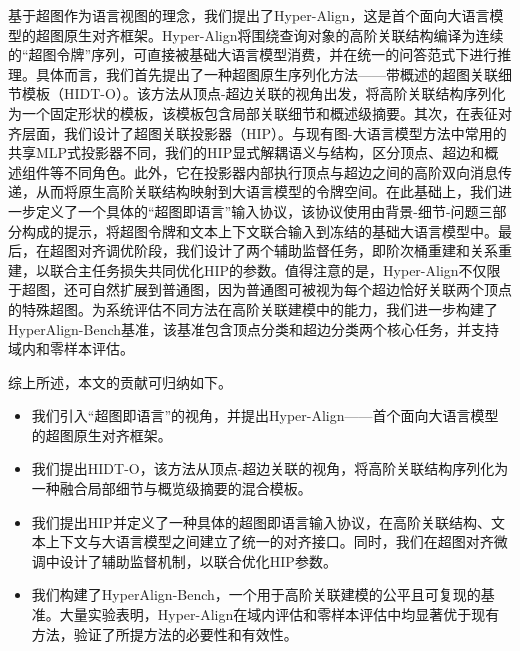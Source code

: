 \documentclass[10pt]{article}
\begin{document}
基于超图作为语言视图的理念，我们提出了Hyper-Align，这是首个面向大语言模型的超图原生对齐框架。Hyper-Align将围绕查询对象的高阶关联结构编译为连续的“超图令牌”序列，可直接被基础大语言模型消费，并在统一的问答范式下进行推理。具体而言，我们首先提出了一种超图原生序列化方法——带概述的超图关联细节模板（HIDT-O）。该方法从顶点-超边关联的视角出发，将高阶关联结构序列化为一个固定形状的模板，该模板包含局部关联细节和概述级摘要。其次，在表征对齐层面，我们设计了超图关联投影器（HIP）。与现有图-大语言模型方法中常用的共享MLP式投影器不同，我们的HIP显式解耦语义与结构，区分顶点、超边和概述组件等不同角色。此外，它在投影器内部执行顶点与超边之间的高阶双向消息传递，从而将原生高阶关联结构映射到大语言模型的令牌空间。在此基础上，我们进一步定义了一个具体的“超图即语言”输入协议，该协议使用由背景-细节-问题三部分构成的提示，将超图令牌和文本上下文联合输入到冻结的基础大语言模型中。最后，在超图对齐调优阶段，我们设计了两个辅助监督任务，即阶次桶重建和关系重建，以联合主任务损失共同优化HIP的参数。值得注意的是，Hyper-Align不仅限于超图，还可自然扩展到普通图，因为普通图可被视为每个超边恰好关联两个顶点的特殊超图。为系统评估不同方法在高阶关联建模中的能力，我们进一步构建了HyperAlign-Bench基准，该基准包含顶点分类和超边分类两个核心任务，并支持域内和零样本评估。

综上所述，本文的贡献可归纳如下。

\begin{itemize}
\item 我们引入“超图即语言”的视角，并提出Hyper-Align——首个面向大语言模型的超图原生对齐框架。
\end{itemize}

\begin{itemize}
\item 我们提出HIDT-O，该方法从顶点-超边关联的视角，将高阶关联结构序列化为一种融合局部细节与概览级摘要的混合模板。
\end{itemize}

\begin{itemize}
\item 我们提出HIP并定义了一种具体的超图即语言输入协议，在高阶关联结构、文本上下文与大语言模型之间建立了统一的对齐接口。同时，我们在超图对齐微调中设计了辅助监督机制，以联合优化HIP参数。
\end{itemize}

\begin{itemize}
\item 我们构建了HyperAlign-Bench，一个用于高阶关联建模的公平且可复现的基准。大量实验表明，Hyper-Align在域内评估和零样本评估中均显著优于现有方法，验证了所提方法的必要性和有效性。
\end{itemize}
\end{document}
